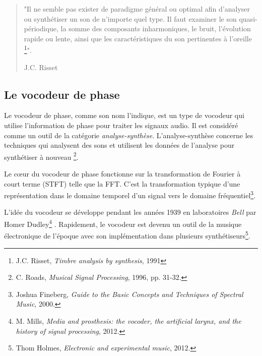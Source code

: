 \begin{quote}
	"Il ne semble pas exister de paradigme général ou optimal afin d'analyser ou synthétiser un son de n'importe quel type. Il faut examiner le son quasi-périodique, la somme des composants inharmoniques, le bruit, l’évolution rapide ou lente, ainsi que les caractéristiques du son pertinentes à l’oreille \footnote{J.C. Risset, \textit{Timbre analysis by synthesis}, 1991 \nocite{risset1991timbre}}". 

	\hfill J.C. Risset
\end{quote}

	\subsection{Le vocodeur de phase}

Le vocodeur de phase, comme son nom l'indique, est un type de vocodeur qui utilise l'information de phase pour traiter les signaux audio. Il est considéré comme un outil de la catégorie \textit{analyse-synthèse}. L'analyse-synthèse concerne les techniques qui analysent des sons et utilisent les données de l'analyse pour synthétiser à nouveau  \footnote{C. Roads, \textit{Musical Signal Processing}, 1996, pp. 31-32. \nocite{Roads97}}. 

Le cœur du vocodeur de phase fonctionne sur la transformation de Fourier à court terme (STFT) telle que la FFT. C'est la transformation typique d'une représentation dans le domaine temporel d'un signal vers le domaine fréquentiel\footnote{Joshua Fineberg, \textit{Guide to the Basic Concepts and Techniques of Spectral Music}, 2000. \nocite{Fin00} }.

L'idée du vocodeur se développe pendant les années 1939 en laboratoires \textit{Bell} par Homer Dudley\footnote{M. Mills, \textit{Media and prosthesis: the vocoder, the artificial larynx, and the history of signal processing}, 2012. \nocite{mills2012media}} . Rapidement, le vocodeur est devenu un outil de la musique électronique de l'époque avec son implémentation dans plusieurs synthétiseurs\footnote{Thom Holmes, \textit{Electronic and experimental music}, 2012. \nocite{holmes2012electronic}}. 

